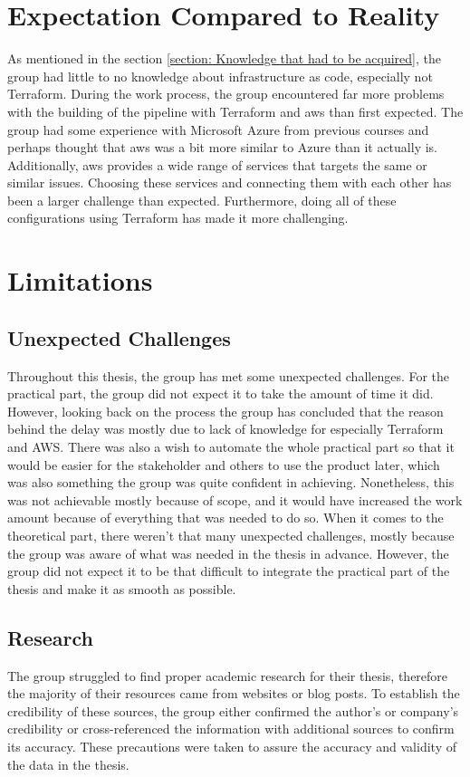 \section{Expectation Compared to Reality}
As mentioned in the section \ref{section: Knowledge that had to be acquired}, the group had little to no knowledge about \gls{infrastructure as code}, especially not Terraform. During the work process, the group encountered far more problems with the building of the pipeline with Terraform and \acrshort{aws} than first expected. The group had some experience with Microsoft Azure from previous courses and perhaps thought that \acrshort{aws} was a bit more similar to Azure than it actually is. Additionally, \acrshort{aws} provides a wide range of services that targets the same or similar issues. Choosing these services and connecting them with each other has been a larger challenge than expected. Furthermore, doing all of these configurations using Terraform has made it more challenging.


\section{Limitations}
\subsection{Unexpected Challenges}
Throughout this thesis, the group has met some unexpected challenges. For the practical part, the group did not expect it to take the amount of time it did. However, looking back on the process the group has concluded that the reason behind the delay was mostly due to lack of knowledge for especially Terraform and AWS. There was also a wish to automate the whole practical part so that it would be easier for the stakeholder and others to use the product later, which was also something the group was quite confident in achieving. Nonetheless, this was not achievable mostly because of scope, and it would have increased the work amount because of everything that was needed to do so. When it comes to the theoretical part, there weren't that many unexpected challenges, mostly because the group was aware of what was needed in the thesis in advance. However, the group did not expect it to be that difficult to integrate the practical part of the thesis and make it as smooth as possible.

\subsection{Research}
The group struggled to find proper academic research for their thesis, therefore the majority of their resources came from websites or blog posts. To establish the credibility of these sources, the group either confirmed the author's or company's credibility or cross-referenced the information with additional sources to confirm its accuracy. These precautions were taken to assure the accuracy and validity of the data in the thesis.  


